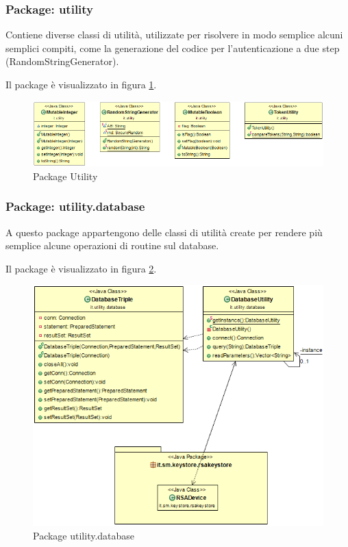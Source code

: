 \subsubsection{Package: \textbf{utility}}

Contiene diverse classi di utilità, utilizzate per risolvere in modo semplice alcuni semplici compiti, come la generazione del codice per l’autenticazione a due step (RandomStringGenerator).


Il package è visualizzato in figura \ref{gfx:dependencies_utility}.

\begin{figure}[!htbp]
	\centering
	\includegraphics[scale = .5]{img/dependencies_utility}
	\caption{Package Utility}
	\label{gfx:dependencies_utility}
\end{figure}

\subsubsection{Package: \textbf{utility.database}}

A questo package appartengono delle classi di utilità create per rendere più semplice alcune operazioni di routine sul database.

Il package è visualizzato in figura \ref{gfx:dependencies_utilitydatabase}.

\begin{figure}[!htbp]
	\centering
	\includegraphics[scale = .5]{img/dependencies_utility_database}
	\caption{Package utility.database}
	\label{gfx:dependencies_utilitydatabase}
\end{figure}

